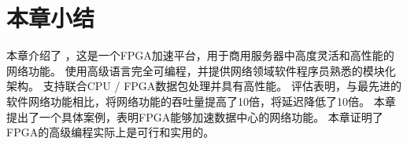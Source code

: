 \section{本章小结}
\label{clicknp:sec:conclusion}

本章介绍了 \name ，这是一个FPGA加速平台，用于商用服务器中高度灵活和高性能的网络功能。
\name 使用高级语言完全可编程，并提供网络领域软件程序员熟悉的模块化架构。
\name 支持联合CPU / FPGA数据包处理并具有高性能。
评估表明，与最先进的软件网络功能相比，\name 将网络功能的吞吐量提高了10倍，将延迟降低了10倍。
本章提出了一个具体案例，表明FPGA能够加速数据中心的网络功能。
本章证明了FPGA的高级编程实际上是可行和实用的。





